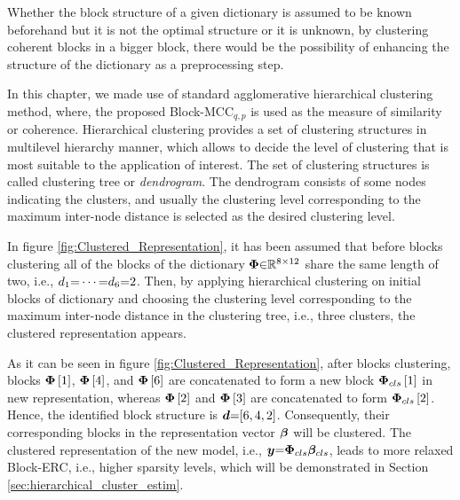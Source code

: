 Whether the block structure of a given dictionary is assumed to be known beforehand but it is not the optimal structure or it is unknown, by clustering coherent blocks in a bigger block, there would be the possibility of enhancing the structure of the dictionary as a preprocessing step. 


In this chapter, we made use of standard agglomerative hierarchical clustering method, where, the proposed Block-MCC$_{q,p}$ is used as the measure of similarity or coherence.
Hierarchical clustering provides a set of clustering structures in multilevel hierarchy manner, which allows to decide the level of clustering that is most suitable to the application of interest. 
The set of clustering structures is called clustering tree or \emph{dendrogram}.
The dendrogram consists of some nodes indicating the clusters, and usually the clustering level corresponding to the maximum inter-node distance is selected as the desired clustering level.

In figure \ref{fig:Clustered_Representation}, it has been assumed that before blocks clustering all of the blocks of the dictionary $\boldsymbol{\Phi} {\in} \mathbb{R}^{8 {\times} 12}$ share the same length of two, i.e., $d_1 {=} \cdots {=} d_6 {=} 2$. 
Then, by applying hierarchical clustering on initial blocks of dictionary and choosing the clustering level corresponding to the maximum inter-node distance in the clustering tree, i.e., three clusters, the clustered representation appears.

As it can be seen in figure \ref{fig:Clustered_Representation}, after blocks clustering, blocks $\boldsymbol{\Phi} \left[ 1 \right]$, $\boldsymbol{\Phi} \left[ 4 \right]$, and $\boldsymbol{\Phi} \left[ 6 \right]$ are concatenated to form a new block $\boldsymbol{\Phi}_{cls} \left[ 1 \right]$ in new representation, whereas $\boldsymbol{\Phi} \left[ 2 \right]$ and $\boldsymbol{\Phi} \left[ 3 \right]$ are concatenated to form $\boldsymbol{\Phi}_{cls} \left[ 2 \right]$.
Hence, the identified block structure is $\boldsymbol{d} {=} [6,4,2]$.
Consequently, their corresponding blocks in the representation vector $\boldsymbol{\beta}$ will be clustered.
The clustered representation of the new model, i.e., $\boldsymbol{y} {=} \boldsymbol{\Phi}_{cls} \boldsymbol{\beta}_{cls}$, leads to more relaxed Block-ERC, i.e., higher sparsity levels, which will be demonstrated in Section \ref{sec:hierarchical_cluster_estim}.

\FloatBarrier